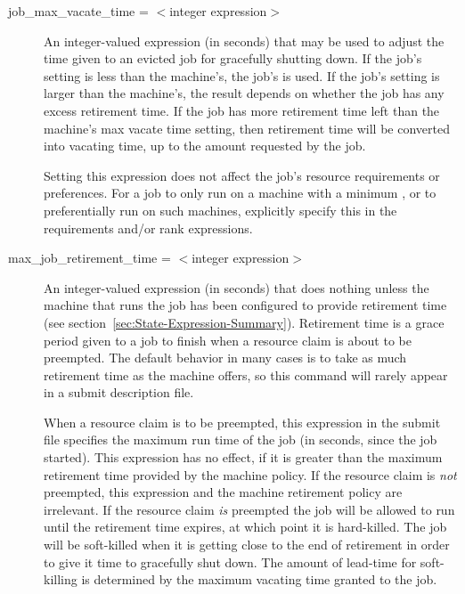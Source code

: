 \begin{description}

\label{condor-submit-job-max-vacate-time}
\item[job\_max\_vacate\_time = $<$integer expression$>$]
An integer-valued expression (in seconds) that may be used to adjust
the time given to an evicted job for gracefully shutting down.  If the
job's setting is less than the machine's, the job's is used.  If the
job's setting is larger than the machine's, the result depends on
whether the job has any excess retirement time.  If the job has more
retirement time left than the machine's max vacate time setting, then
retirement time will be converted into vacating time, up to the amount
requested by the job.

Setting this expression does not affect the job's resource
requirements or preferences.  For a job to only run on a machine with
a minimum , or to preferentially run on
such machines, explicitly specify this in the requirements and/or rank
expressions.


\label{condor-submit-max-job-retirement-time}
\item[max\_job\_retirement\_time = $<$integer expression$>$]
An integer-valued expression (in seconds) that
does nothing unless the machine that runs the job has been configured
to provide retirement time
(see section~\ref{sec:State-Expression-Summary}).
Retirement time is a
grace period given to a job to finish
when a resource claim is about to be preempted.
The default behavior in many cases is to take as much
retirement time as the machine offers,
so this command will rarely appear in a submit description file.

When a resource claim is to be preempted, this expression in the
submit file specifies the maximum run time of the job (in seconds, since
the job started).
This expression has no effect,
if it is greater than the maximum retirement time provided
by the machine policy.
If the resource claim is \emph{not} preempted,
this expression and the machine retirement policy are irrelevant. 
If the resource claim \emph{is} preempted
the job will be allowed to run until the retirement
time expires, at which point it is hard-killed.
The job will be soft-killed when it is getting close
to the end of retirement in order to give it time
to gracefully shut down.  The amount of lead-time
for soft-killing is determined by the maximum vacating
time granted to the job.


\end{description}
